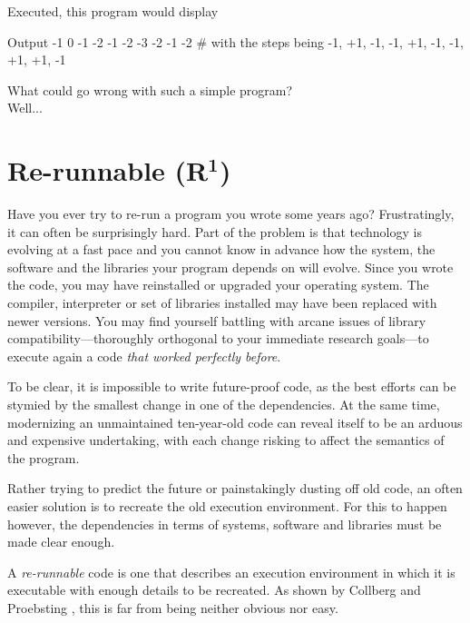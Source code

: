 Executed, this program would display 
\begin{code}{Output}
-1  0 -1 -2 -1 -2 -3 -2 -1 -2 # with the steps being -1, +1, -1, -1, +1, -1, -1, +1, +1, -1
\end{code}

What could go wrong with such a simple program?\\
\vfill
Well...
\vfill


\clearpage
\section*{Re-runnable (R$^{\mathbf 1}$)}

Have you ever try to re-run a program you wrote some years ago?
Frustratingly, it can often be surprisingly hard. 
Part of the problem is that technology is evolving at a fast pace
and you cannot  know in advance
how the system, the software and the libraries your program depends on will evolve.
Since you wrote the code,
you may have reinstalled or upgraded  your operating system.
The compiler, interpreter or set of libraries installed may have been replaced with newer versions. 
You may find yourself battling with
arcane issues of library compatibility---thoroughly orthogonal to your immediate research  goals---to execute again a code \emph{that worked perfectly before}. 

To be clear, it is impossible to write future-proof code,
as the best efforts can be stymied by the smallest change in one of the dependencies.
At the same time, modernizing an unmaintained ten-year-old code
can reveal itself to be an arduous and expensive undertaking,
with each change risking to affect the semantics of the program.

Rather trying to predict the future or painstakingly dusting off old code, 
an often easier solution is to recreate the old execution environment.
For this to happen however,
the dependencies in terms of systems, software and libraries
must be made clear enough.

A \emph{re-runnable} code is one that describes
an execution environment in which it is executable with enough details to be recreated.
As shown by Collberg and Proebsting \cite{Collberg:2016},
this is far from being neither obvious nor easy.

